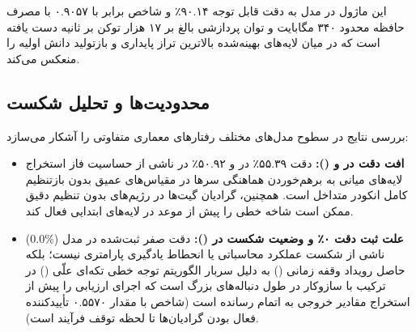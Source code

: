 این ماژول در مدل  به دقت قابل توجه ۹۰.۱۴٪ و شاخص  برابر با ۰.۹۰۵۷ با مصرف حافظه محدود ۳۴۰ مگابایت و توان پردازشی بالغ بر ۱۷ هزار توکن بر ثانیه دست یافته است که در میان لایه‌های بهینه‌شده بالاترین تراز پایداری و بازتولید دانش اولیه را منعکس می‌کند.

\subsection{محدودیت‌ها و تحلیل شکست}
بررسی نتایج در سطوح مدل‌های مختلف رفتارهای معماری متفاوتی را آشکار می‌سازد:
\begin{itemize}
    \item \textbf{افت دقت در  و  ():} دقت ۵۵.۳۹٪ در  و ۵۰.۹۲٪ در  ناشی از حساسیت فاز استخراج لایه‌های میانی به برهم‌خوردن هماهنگی سرها در مقیاس‌های عمیق بدون بازتنظیم کامل انکودر متداخل است. همچنین، گرادیان گیت‌ها در رژیم‌های بدون تنظیم دقیق ممکن است شاخه خطی را پیش از موعد در لایه‌های ابتدایی فعال کند.
    \item \textbf{علت ثبت دقت ۰٪ و وضعیت شکست در  ():} دقت صفر ثبت‌شده در مدل  ($0.0\%$) ناشی از شکست عملکرد محاسباتی یا انحطاط یادگیری پارامتری نیست؛ بلکه حاصل رویداد وقفه زمانی () به دلیل سربار الگوریتم توجه خطی تکه‌ای علّی () در ترکیب با سازوکار  در طول دنباله‌های بزرگ است که اجرای ارزیابی را پیش از استخراج مقادیر خروجی به اتمام رسانده است (شاخص  با مقدار ۰.۵۵۷۰ تأییدکننده فعال بودن گرادیان‌ها تا لحظه توقف فرآیند است).
\end{itemize}
